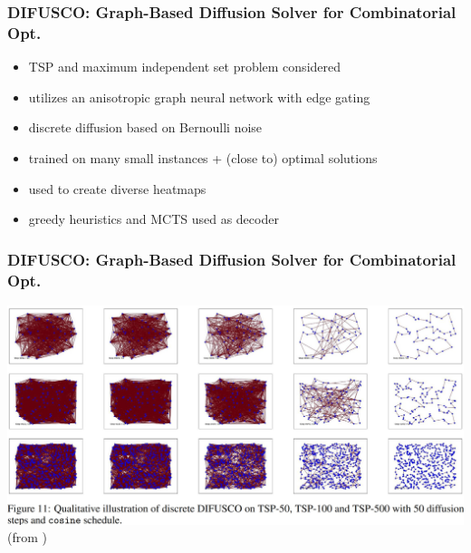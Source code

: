 \documentclass[aspectratio=1610]{beamer}
\newcommand{\important}[1]{{\color{green!60!black}#1}}
\begin{document}
\begin{frame}
	\frametitle{DIFUSCO: Graph-Based Diffusion Solver for Combinatorial Opt.} 
	
	\citep{sun-23}

	\bigskip
	\begin{itemize}
		\itemsep1ex
		\item TSP and maximum independent set problem considered
		\item utilizes an anisotropic \important{graph neural network} with edge gating
		\item \important{discrete diffusion} based on Bernoulli noise
		\item trained on many small instances + (close to) optimal solutions
		\item used to create \important{diverse heatmaps} 
		\item greedy heuristics and MCTS used as decoder
	\end{itemize}

	\bigskip
\end{frame}

\begin{frame}
	\frametitle{DIFUSCO: Graph-Based Diffusion Solver for Combinatorial Opt.}

	\begin{center}
		\includegraphics[width=\textwidth]{graphics/difusco1.jpg}
		(from \citet{sun-23})
	\end{center}
\end{frame}
\end{document}
